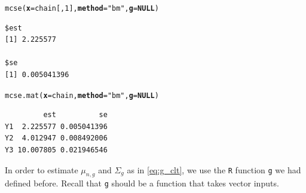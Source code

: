 \documentclass[11pt]{article}\usepackage[]{graphicx}\usepackage[]{color}
\makeatletter
\newcommand{\hlnum}[1]{\textcolor[rgb]{1,0.078,0.576}{#1}}%
\newcommand{\hlstr}[1]{\textcolor[rgb]{1,0.078,0.576}{#1}}%
\newcommand{\hlstd}[1]{\textcolor[rgb]{0,0,0}{#1}}%
\newcommand{\hlkwa}[1]{\textcolor[rgb]{0.18,0.545,0.341}{\textbf{#1}}}%
\newcommand{\hlkwc}[1]{\textcolor[rgb]{0.412,0.412,0.412}{\textbf{#1}}}%
\newcommand{\hlkwd}[1]{\textcolor[rgb]{0,0,0.561}{#1}}%
\newenvironment{kframe}{%
 \def\at@end@of@kframe{}%
 \ifinner\ifhmode%
  \def\at@end@of@kframe{\end{minipage}}%
  \begin{minipage}{\columnwidth}%
 \fi\fi%
 \def\FrameCommand##1{\hskip\@totalleftmargin \hskip-\fboxsep
 \colorbox{shadecolor}{##1}\hskip-\fboxsep
     \hskip-\linewidth \hskip-\@totalleftmargin \hskip\columnwidth}%
 \MakeFramed {\advance\hsize-\width
   \@totalleftmargin\z@ \linewidth\hsize
   \@setminipage}}%
 {\par\unskip\endMakeFramed%
 \at@end@of@kframe}
\newenvironment{knitrout}{}{} %
\makeatother
\begin{document}
\begin{knitrout}
\color{fgcolor}\begin{kframe}
\begin{alltt}
\hlkwd{mcse}\hlstd{(}\hlkwc{x} \hlstd{= chain[,}\hlnum{1}\hlstd{],} \hlkwc{method} \hlstd{=} \hlstr{"bm"}\hlstd{,} \hlkwc{g} \hlstd{=} \hlkwa{NULL}\hlstd{)}
\end{alltt}
\begin{verbatim}
$est
[1] 2.225577

$se
[1] 0.005041396
\end{verbatim}
\begin{alltt}
\hlkwd{mcse.mat}\hlstd{(}\hlkwc{x} \hlstd{= chain,} \hlkwc{method} \hlstd{=} \hlstr{"bm"}\hlstd{,} \hlkwc{g} \hlstd{=} \hlkwa{NULL}\hlstd{)}
\end{alltt}
\begin{verbatim}
         est          se
Y1  2.225577 0.005041396
Y2  4.012947 0.008492006
Y3 10.007805 0.021946546
\end{verbatim}
\end{kframe}
\end{knitrout}


In order to estimate $\mu_{n,g}$ and $\Sigma_g$ as in \eqref{eq:g_clt}, we use the \texttt{R} function \texttt{g} we had defined before. Recall that \texttt{g} should be a function that takes vector inputs.
\end{document}
